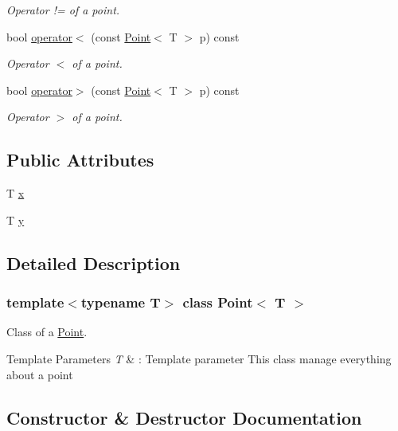 \begin{DoxyCompactItemize}
\begin{DoxyCompactList}\small\item\em Operator != of a point. \end{DoxyCompactList}\item 
bool \hyperlink{classPoint_ac6b57554a6941b07668b52c66fe20fae}{operator$<$} (const \hyperlink{classPoint}{Point}$<$ T $>$ p) const
\begin{DoxyCompactList}\small\item\em Operator $<$ of a point. \end{DoxyCompactList}\item 
bool \hyperlink{classPoint_ade386be90f64de342ada7165415daf07}{operator$>$} (const \hyperlink{classPoint}{Point}$<$ T $>$ p) const
\begin{DoxyCompactList}\small\item\em Operator $>$ of a point. \end{DoxyCompactList}\end{DoxyCompactItemize}
\subsection*{Public Attributes}
\begin{DoxyCompactItemize}
\item 
T \hyperlink{classPoint_a401d07562afaf0079121218025e66b76}{x}
\item 
T \hyperlink{classPoint_a65146418a33ebb2cd9acb85cade60ac9}{y}
\end{DoxyCompactItemize}


\subsection{Detailed Description}
\subsubsection*{template$<$typename T$>$\newline
class Point$<$ T $>$}

Class of a \hyperlink{classPoint}{Point}. 


\begin{DoxyTemplParams}{Template Parameters}
{\em T} & \+: Template parameter This class manage everything about a point \\
\hline
\end{DoxyTemplParams}


\subsection{Constructor \& Destructor Documentation}
\mbox{\label{classPoint_acfb36323391d7fe1e451137f8c39cde7}} 
